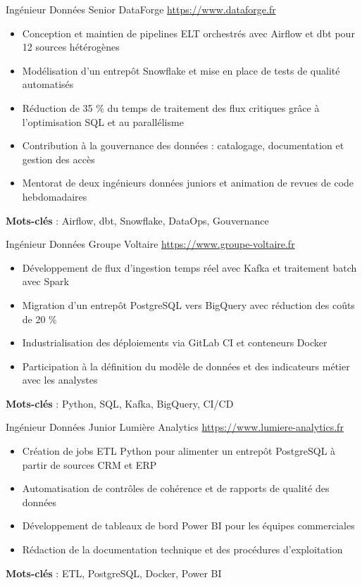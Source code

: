 \documentclass[a4paper, serif, 10pt]{moderncv}
\begin{document}
        {Ingénieur Données Senior}
        {DataForge}
        {\url{https://www.dataforge.fr}}
        {}
        {\begin{itemize}
\item Conception et maintien de pipelines ELT orchestrés avec Airflow et dbt pour 12 sources hétérogènes
\item Modélisation d'un entrepôt Snowflake et mise en place de tests de qualité automatisés
\item Réduction de 35 \% du temps de traitement des flux critiques grâce à l'optimisation SQL et au parallélisme
\item Contribution à la gouvernance des données : catalogage, documentation et gestion des accès
\item Mentorat de deux ingénieurs données juniors et animation de revues de code hebdomadaires
\end{itemize}
\textbf{Mots-clés} : Airflow, dbt, Snowflake, DataOps, Gouvernance}

        {Ingénieur Données}
        {Groupe Voltaire}
        {\url{https://www.groupe-voltaire.fr}}
        {}
        {\begin{itemize}
\item Développement de flux d'ingestion temps réel avec Kafka et traitement batch avec Spark
\item Migration d'un entrepôt PostgreSQL vers BigQuery avec réduction des coûts de 20 \%
\item Industrialisation des déploiements via GitLab CI et conteneurs Docker
\item Participation à la définition du modèle de données et des indicateurs métier avec les analystes
\end{itemize}
\textbf{Mots-clés} : Python, SQL, Kafka, BigQuery, CI/CD}

        {Ingénieur Données Junior}
        {Lumière Analytics}
        {\url{https://www.lumiere-analytics.fr}}
        {}
        {\begin{itemize}
\item Création de jobs ETL Python pour alimenter un entrepôt PostgreSQL à partir de sources CRM et ERP
\item Automatisation de contrôles de cohérence et de rapports de qualité des données
\item Développement de tableaux de bord Power BI pour les équipes commerciales
\item Rédaction de la documentation technique et des procédures d'exploitation
\end{itemize}
\textbf{Mots-clés} : ETL, PostgreSQL, Docker, Power BI}
\end{document}
